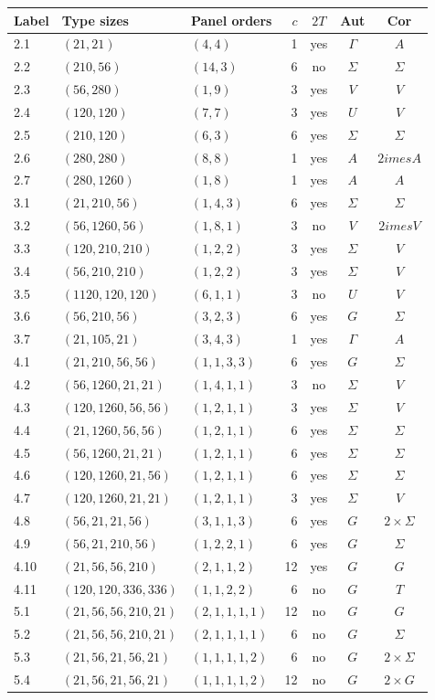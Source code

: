 \begin{longtable}{@{}l l l r c c c@{}}
\toprule Label & Type sizes & Panel orders & $c$ & $2T$ & Aut & Cor\\\midrule\endhead
2.1&$(21,21)$&$(4,4)$&1&yes&$\Gamma$&$A$\\
2.2&$(210,56)$&$(14,3)$&6&no&$\Sigma$&$\Sigma$\\
2.3&$(56,280)$&$(1,9)$&3&yes&$V$&$V$\\
2.4&$(120,120)$&$(7,7)$&3&yes&$U$&$V$\\
2.5&$(210,120)$&$(6,3)$&6&yes&$\Sigma$&$\Sigma$\\
2.6&$(280,280)$&$(8,8)$&1&yes&$A$&$2	imes A$\\
2.7&$(280,1260)$&$(1,8)$&1&yes&$A$&$A$\\
3.1&$(21,210,56)$&$(1,4,3)$&6&yes&$\Sigma$&$\Sigma$\\
3.2&$(56,1260,56)$&$(1,8,1)$&3&no&$V$&$2	imes V$\\
3.3&$(120,210,210)$&$(1,2,2)$&3&yes&$\Sigma$&$V$\\
3.4&$(56,210,210)$&$(1,2,2)$&3&yes&$\Sigma$&$V$\\
3.5&$(1120,120,120)$&$(6,1,1)$&3&no&$U$&$V$\\
3.6&$(56,210,56)$&$(3,2,3)$&6&yes&$G$&$\Sigma$\\
3.7&$(21,105,21)$&$(3,4,3)$&1&yes&$\Gamma$&$A$\\
4.1&$(21,210,56,56)$&$(1,1,3,3)$&6&yes&$G$&$\Sigma$\\
4.2&$(56,1260,21,21)$&$(1,4,1,1)$&3&no&$\Sigma$&$V$\\
4.3&$(120,1260,56,56)$&$(1,2,1,1)$&3&yes&$\Sigma$&$V$\\
4.4&$(21,1260,56,56)$&$(1,2,1,1)$&6&yes&$\Sigma$&$\Sigma$\\
4.5&$(56,1260,21,21)$&$(1,2,1,1)$&6&yes&$\Sigma$&$\Sigma$\\
4.6&$(120,1260,21,56)$&$(1,2,1,1)$&6&yes&$\Sigma$&$\Sigma$\\
4.7&$(120,1260,21,21)$&$(1,2,1,1)$&3&yes&$\Sigma$&$V$\\
4.8&$(56,21,21,56)$&$(3,1,1,3)$&6&yes&$G$&$2\times\Sigma$\\
4.9&$(56,21,210,56)$&$(1,2,2,1)$&6&yes&$G$&$\Sigma$\\
4.10&$(21,56,56,210)$&$(2,1,1,2)$&12&yes&$G$&$G$\\
4.11&$(120,120,336,336)$&$(1,1,2,2)$&6&no&$G$&$T$\\
5.1&$(21,56,56,210,21)$&$(2,1,1,1,1)$&12&no&$G$&$G$\\
5.2&$(21,56,56,210,21)$&$(2,1,1,1,1)$&6&no&$G$&$\Sigma$\\
5.3&$(21,56,21,56,21)$&$(1,1,1,1,2)$&6&no&$G$&$2\times\Sigma$\\
5.4&$(21,56,21,56,21)$&$(1,1,1,1,2)$&12&no&$G$&$2\times G$\\
\bottomrule\end{longtable}
